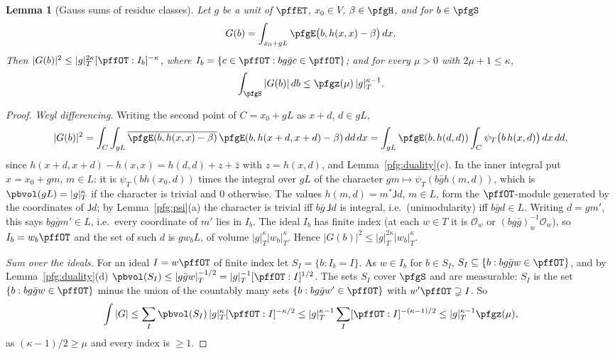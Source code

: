 \documentclass[10pt]{amsart}
\newtheorem{lemma}[theorem]{Lemma}
\theoremstyle{definition}
\theoremstyle{remark}
\providecommand{\auO}{\mathcal O}
\begin{document}
\begin{lemma}[Gauss sums of residue classes]\label{pfg:gauss}
Let $g$ be a unit of $\pffET$, $x_0\in V$, $\beta\in\pfgH$, and for $b\in\pfgS$
\[
G(b)=\int_{x_0+gL}\pfgE\bigl(b,h(x,x)-\beta\bigr)\,dx .
\]
Then $|G(b)|^2\le|g|_T^{2\kappa}[\pffOT:I_b]^{-\kappa}$, where $I_b=\{c\in\pffOT:bg\bar gc\in\pffOT\}$; and for every
$\mu>0$ with $2\mu+1\le\kappa$,
\[
\int_{\pfgS}|G(b)|\,db\le\pfgz(\mu)\,|g|_T^{\kappa-1}.
\]
\end{lemma}
\begin{proof}
\emph{Weyl differencing.} Writing the second point of $C=x_0+gL$ as $x+d$, $d\in gL$,
\[
|G(b)|^2=\int_C\int_{gL}\overline{\pfgE(b,h(x,x)-\beta)}\,\pfgE(b,h(x+d,x+d)-\beta)\,dd\,dx=\int_{gL}\pfgE(b,h(d,d))
\int_C\psi_T\bigl(b\,h(x,d)\bigr)\,dx\,dd ,
\]
since $h(x+d,x+d)-h(x,x)=h(d,d)+z+\bar z$ with $z=h(x,d)$, and Lemma~\ref{pfg:duality}(c). In the inner integral put
$x=x_0+gm$, $m\in L$: it is $\psi_T(bh(x_0,d))$ times the integral over $gL$ of the character $gm\mapsto\psi_T(b\bar g
h(m,d))$, which is $\pbvol(gL)=|g|_T^\kappa$ if the character is trivial and $0$ otherwise. The values $h(m,d)=m^*\mathsf
Jd$, $m\in L$, form the $\pffOT$-module generated by the coordinates of $\mathsf Jd$; by Lemma~\ref{pfg:psi}(a) the
character is trivial iff $b\bar g\,\mathsf Jd$ is integral, i.e.\ (unimodularity) iff $b\bar gd\in L$. Writing
$d=gm'$, this says $bg\bar gm'\in L$, i.e.\ every coordinate of $m'$ lies in $I_b$. The ideal $I_b$ has finite index
(at each $w\in T$ it is $\auO_w$ or $(bg\bar g)_w^{-1}\auO_w$), so $I_b=w_b\pffOT$ and the set of such $d$ is $gw_bL$,
of volume $|g|_T^\kappa|w_b|_T^\kappa$. Hence $|G(b)|^2\le|g|_T^{2\kappa}|w_b|_T^\kappa$.

\emph{Sum over the ideals.} For an ideal $I=w\pffOT$ of finite index let $S_I=\{b:I_b=I\}$. As $w\in I_b$ for $b\in S_I$,
$S_I\subseteq\{b:bg\bar gw\in\pffOT\}$, and by Lemma~\ref{pfg:duality}(d) $\pbvol(S_I)\le|g\bar gw|_T^{-1/2}=|g|_T^{-1}
[\pffOT:I]^{1/2}$. The sets $S_I$ cover $\pfgS$ and are measurable: $S_I$ is the set $\{b:bg\bar gw\in\pffOT\}$ minus the union of the
countably many sets $\{b:bg\bar gw'\in\pffOT\}$ with $w'\pffOT\supsetneq I$. So
\[
\int|G|\le\sum_I\pbvol(S_I)\,|g|_T^\kappa[\pffOT:I]^{-\kappa/2}\le|g|_T^{\kappa-1}\sum_I[\pffOT:I]^{-(\kappa-1)/2}\le
|g|_T^{\kappa-1}\pfgz(\mu),
\]
as $(\kappa-1)/2\ge\mu$ and every index is $\ge1$.
\end{proof}
\end{document}
